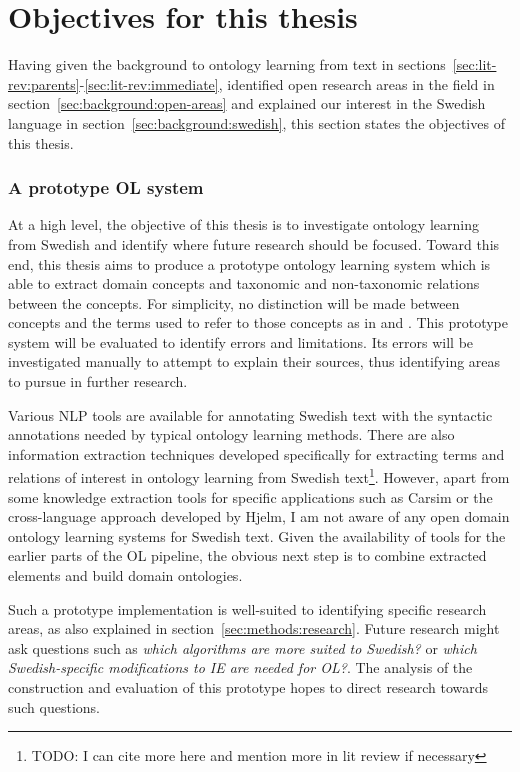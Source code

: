 \documentclass[a4paper]{report}
\newcommand{\todo}[1]{\footnote{{\color{red} TODO: #1}}}
\begin{document}
\section{Objectives for this thesis}
\label{sec:background:objectives}

Having given the background to ontology learning from text in sections~\ref{sec:lit-rev:parents}-\ref{sec:lit-rev:immediate}, identified open research areas in the field in section~\ref{sec:background:open-areas} and explained our interest in the Swedish language in section~\ref{sec:background:swedish}, this section states the objectives of this thesis.

\subsubsection{A prototype OL system}

At a high level, the objective of this thesis is to investigate ontology learning from Swedish and identify where future research should be focused.
Toward this end, this thesis aims to produce a prototype ontology learning system which is able to extract domain concepts and taxonomic and non-taxonomic relations between the concepts.
For simplicity, no distinction will be made between concepts and the terms used to refer to those concepts as in \cite{Hjelm09Thesis} and \cite{DellschaftStaab06HowGold}.
This prototype system will be evaluated to identify errors and limitations.
Its errors will be investigated manually to attempt to explain their sources, thus identifying areas to pursue in further research.

Various NLP tools are available for annotating Swedish text with the syntactic annotations needed by typical ontology learning methods.
There are also information extraction techniques developed specifically for extracting terms and relations of interest in ontology learning from Swedish text\cite{Kokkinakis08SolidComp}\todo{I can cite more here and mention more in lit review if necessary}.
However, apart from some knowledge extraction tools for specific applications such as Carsim\cite{JohanssonEtAll04Carsim} or the cross-language approach developed by Hjelm\cite{Hjelm09Thesis}, I am not aware of any open domain ontology learning systems for Swedish text.
Given the availability of tools for the earlier parts of the OL pipeline, the obvious next step is to combine extracted elements and build domain ontologies.

Such a prototype implementation is well-suited to identifying specific research areas, as also explained in section~\ref{sec:methods:research}.
Future research might ask questions such as \emph{which algorithms are more suited to Swedish?} or \emph{which Swedish-specific modifications to IE are needed for OL?}.
The analysis of the construction and evaluation of this prototype hopes to direct research towards such questions.
\end{document}
